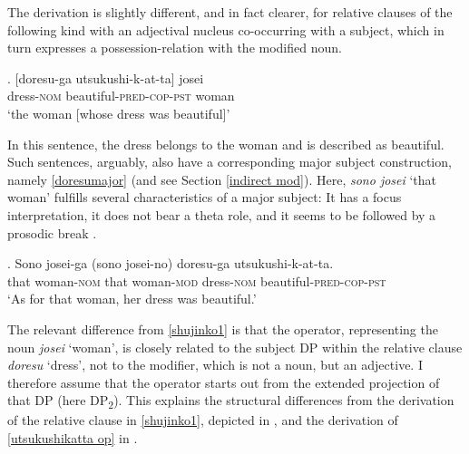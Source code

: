 The derivation is slightly different, and in fact clearer, for relative clauses of the following kind with an adjectival nucleus co-occurring with a subject, which in turn expresses a possession-relation with the modified noun.

\exg. [doresu-ga utsukushi-k-at-ta] josei\\
dress-\textsc{nom} beautiful-\textsc{pred-cop-pst} woman\\
`the woman [whose dress was beautiful]’ \label{utsukushikatta op}

In this sentence, the dress belongs to the woman and is described as beautiful. Such sentences, arguably, also have a corresponding major subject construction, namely \ref{doresumajor} (and see Section \ref{indirect mod}). Here, \textit{sono josei} `that woman' fulfills several characteristics of a major subject: It has a focus interpretation, it does not bear a theta role, and it seems to be followed by a prosodic break \citep[1346–1348]{vermeulen:2005:poss}.

\exg. Sono josei-ga (sono josei-no) doresu-ga utsukushi-k-at-ta.\\
that woman-\textsc{nom} that woman-\textsc{mod} dress-\textsc{nom} beautiful-\textsc{pred-cop-pst}\\
`As for that woman, her dress was beautiful.’ \label{doresumajor}

The relevant difference from \ref{shujinko1} is that the operator, representing the noun \textit{josei} `woman’, is closely related to the subject DP within the relative clause \textit{doresu} `dress’, not to the modifier, which is not a noun, but an adjective. I therefore assume that the operator starts out from the extended projection of that DP (here DP\textsubscript{2}). This explains the structural differences from the derivation of the relative clause in \ref{shujinko1}, depicted in , and the derivation of \ref{utsukushikatta op} in . 



